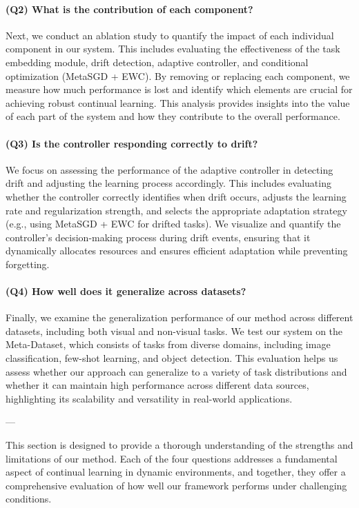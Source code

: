 \documentclass[conference]{IEEEtran}
\begin{document}
\paragraph{(Q2) What is the contribution of each component?}  
Next, we conduct an ablation study to quantify the impact of each individual component in our system. This includes evaluating the effectiveness of the task embedding module, drift detection, adaptive controller, and conditional optimization (MetaSGD + EWC). By removing or replacing each component, we measure how much performance is lost and identify which elements are crucial for achieving robust continual learning. This analysis provides insights into the value of each part of the system and how they contribute to the overall performance.

\paragraph{(Q3) Is the controller responding correctly to drift?}  
We focus on assessing the performance of the adaptive controller in detecting drift and adjusting the learning process accordingly. This includes evaluating whether the controller correctly identifies when drift occurs, adjusts the learning rate and regularization strength, and selects the appropriate adaptation strategy (e.g., using MetaSGD + EWC for drifted tasks). We visualize and quantify the controller’s decision-making process during drift events, ensuring that it dynamically allocates resources and ensures efficient adaptation while preventing forgetting.

\paragraph{(Q4) How well does it generalize across datasets?}  
Finally, we examine the generalization performance of our method across different datasets, including both visual and non-visual tasks. We test our system on the Meta-Dataset, which consists of tasks from diverse domains, including image classification, few-shot learning, and object detection. This evaluation helps us assess whether our approach can generalize to a variety of task distributions and whether it can maintain high performance across different data sources, highlighting its scalability and versatility in real-world applications.

---

This section is designed to provide a thorough understanding of the strengths and limitations of our method. Each of the four questions addresses a fundamental aspect of continual learning in dynamic environments, and together, they offer a comprehensive evaluation of how well our framework performs under challenging conditions.
\end{document}
